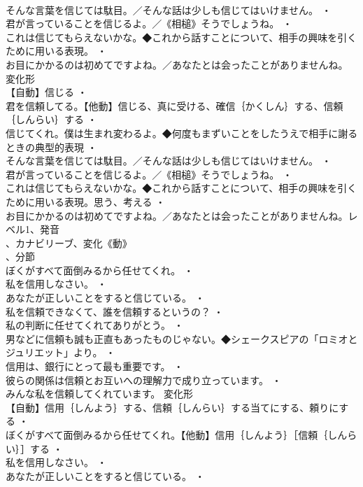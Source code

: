 \documentclass[8pt]{extreport}
\begin{document}
\begin{CJK}{UTF8}{min}
\\	そんな言葉を信じては駄目。／そんな話は少しも信じてはいけません。 ・
\\	君が言っていることを信じるよ。／《相槌》そうでしょうね。 ・
\\	これは信じてもらえないかな。◆これから話すことについて、相手の興味を引くために用いる表現。 ・
\\	お目にかかるのは初めてですよね。／あなたとは会ったことがありませんね。	変化形 
\\	【自動】信じる ・
\\	君を信頼してる。【他動】信じる、真に受ける、確信｛かくしん｝する、信頼｛しんらい｝する ・
\\	信じてくれ。僕は生まれ変わるよ。◆何度もまずいことをしたうえで相手に謝るときの典型的表現 ・
\\	そんな言葉を信じては駄目。／そんな話は少しも信じてはいけません。 ・
\\	君が言っていることを信じるよ。／《相槌》そうでしょうね。 ・
\\	これは信じてもらえないかな。◆これから話すことについて、相手の興味を引くために用いる表現。思う、考える ・
\\	お目にかかるのは初めてですよね。／あなたとは会ったことがありませんね。レベル1、発音
\\	、カナビリーブ、変化《動》
\\	、分節
\\	ぼくがすべて面倒みるから任せてくれ。 ・
\\	私を信用しなさい。 ・
\\	あなたが正しいことをすると信じている。 ・
\\	私を信頼できなくて、誰を信頼するというの？ ・
\\	私の判断に任せてくれてありがとう。 ・
\\	男などに信頼も誠も正直もあったものじゃない。◆シェークスピアの「ロミオとジュリエット」より。 ・
\\	信用は、銀行にとって最も重要です。 ・
\\	彼らの関係は信頼とお互いへの理解力で成り立っています。 ・
\\	みんな私を信頼してくれています。	変化形 
\\	【自動】信用｛しんよう｝する、信頼｛しんらい｝する当てにする、頼りにする ・
\\	ぼくがすべて面倒みるから任せてくれ。【他動】信用｛しんよう｝［信頼｛しんらい｝］する ・
\\	私を信用しなさい。 ・
\\	あなたが正しいことをすると信じている。 ・

\end{CJK}
\end{document}
